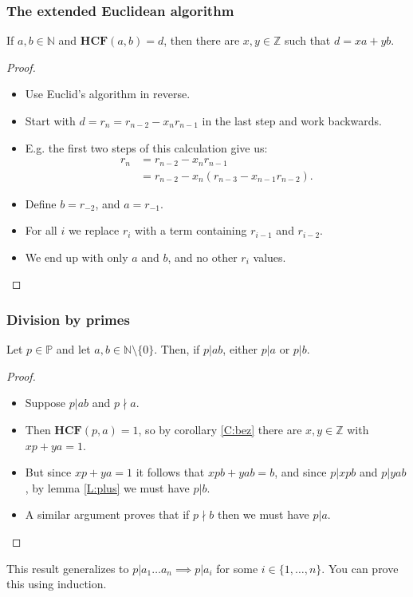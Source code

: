 \documentclass[handout]{beamer}
\newcommand{\bN}{\mathbb{N}}
\newcommand{\bZ}{\mathbb{Z}}
\newcommand{\bP}{\mathbb{P}}
\newcommand{\HCF}{\mathbf{HCF}}
\begin{document}
\begin{frame}
\frametitle{The extended Euclidean algorithm}
\begin{corollary}\label{C:bez}
If $a,b\in\bN$ and $\HCF(a,b)=d$, then there are $x,y\in \bZ$ such that $d= xa + yb$. 
\end{corollary}
\begin{proof}
\begin{itemize}
\item Use Euclid's algorithm in reverse.
\item Start with $d = r_n = r_{n-2} - x_n r_{n-1}$ in the last step and work backwards. 
\item E.g. the first two steps of this calculation give us:
\begin{align*}
r_n&= r_{n-2}-x_nr_{n-1}\\
&= r_{n-2} - x_n(r_{n-3}-x_{n-1}r_{n-2}).
\end{align*}
\item Define $b = r_{-2}$, and $a = r_{-1}$. 
\item For all $i$ we replace $r_i$ with a term containing $r_{i-1}$ and $r_{i-2}$. 
\item We end up with only $a$ and $b$, and no other $r_i$ values.  
\end{itemize}
\end{proof}
\end{frame}

\begin{frame}
\frametitle{Division by primes}
\begin{lemma}\label{L:div2}
Let $p\in \bP$ and let $a,b\in\bN\setminus\{0\}$. Then, if $p|ab$, either $p|a$ or $p|b$.
\end{lemma}
\begin{proof}
\begin{itemize}
\item Suppose $p|ab$ and $p\nmid a$. 
\item Then $\HCF(p,a)=1$, so by corollary \ref{C:bez} there are $x,y\in\bZ$ with $xp+ya = 1$. 
\item But since $xp+ya = 1$ it follows that $xpb+yab = b$, and since $p|xpb$ and $p|yab$, by lemma \ref{L:plus} we must have $p|b$. 
\item A similar argument proves that if $p\nmid b$ then we must have $p|a$. 
\end{itemize}
\end{proof}

This result generalizes to $p|a_1\ldots a_n\implies p|a_i$ for some $i\in \{1,\ldots,n\}$. You can prove this using induction.  
\end{frame}
\end{document}
